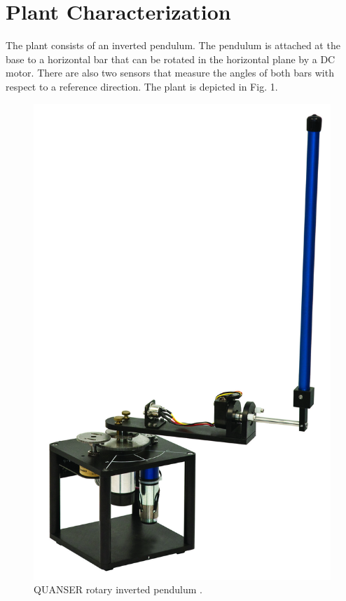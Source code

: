 \documentclass[letterpaper, 10 pt, conference]{ieeeconf}
\begin{document}
\section{Plant Characterization}\label{sec:car}
The plant consists of an inverted pendulum. The pendulum is attached at the base to a horizontal bar that can be rotated in the horizontal plane by a DC motor. There are also two sensors that measure the angles of both bars with respect to a reference direction. The plant is depicted in Fig. 1. 
\begin{figure}[h]
    \centering
    \includegraphics[scale=0.1]{figures/ROTPEN-graphics.png}
    \caption{QUANSER rotary inverted pendulum \cite{balula2016nonlinear}.}
\end{figure}
\end{document}
